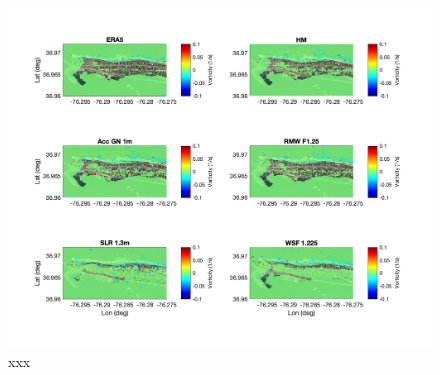 \documentclass[preprint,12pt,authoryear]{elsarticle}
\begin{document}
\begin{figure}
\centering
\includegraphics[width=\textwidth]{./figures/funwave_vort_6_cases.jpg}
\caption{xxx }
\label{boundary}
\centering
\end{figure}



%

\end{document}

